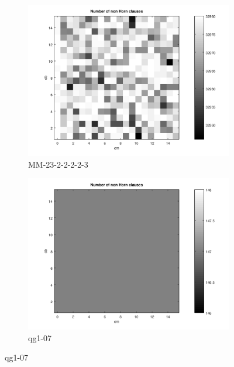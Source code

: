 \documentclass[12pt,a4paper]{article}
\begin{document}
\begin{figure}[H]
  \begin{subfigure}{0.45\textwidth}
    \includegraphics[width=\textwidth]{probSAT/probSATexp_MM-23-2-2-2-2-3[SKIP=0].png}
    \caption{MM-23-2-2-2-2-3}
  \end{subfigure}
  \begin{subfigure}{0.45\textwidth}
    \includegraphics[width=\textwidth]{probSAT/probSATexp_qg1-07[SKIP=0].png}
    \caption{qg1-07}
  \end{subfigure}
\end{figure}
\end{document}
